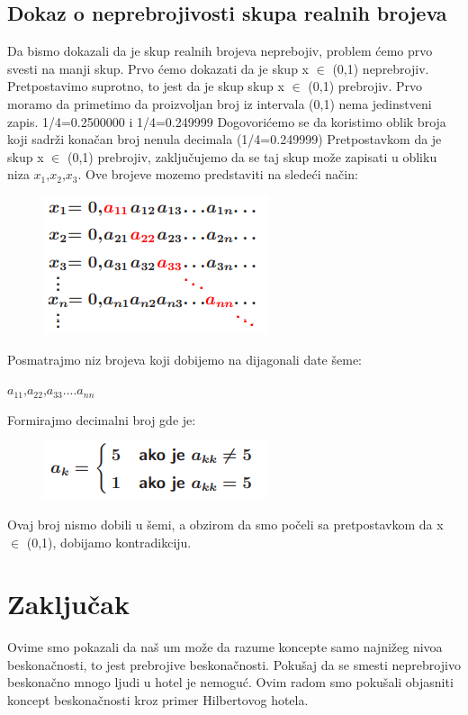 \documentclass[a4paper]{article}
\begin{document}
\subsection{Dokaz o neprebrojivosti skupa realnih brojeva}
Da bismo dokazali da je skup realnih brojeva neprebojiv, problem ćemo prvo svesti na manji skup. 
Prvo ćemo dokazati da je skup x $\in$ (0,1) neprebrojiv.
\newline
Pretpostavimo suprotno, to jest da je skup skup x $\in$ (0,1) prebrojiv.
Prvo moramo da primetimo da proizvoljan broj iz intervala (0,1) nema jedinstveni zapis. 
1/4=0.2500000 i 1/4=0.249999
Dogovorićemo se da koristimo oblik broja koji sadrži konačan broj nenula decimala (1/4=0.249999)
Pretpostavkom da je skup x $\in$ (0,1) prebrojiv, zaključujemo da se taj skup može zapisati u obliku niza {$x_{1}$,$x_{2}$,$x_{3}$}.
\newline
Ove brojeve mozemo predstaviti na sledeći način:
 \begin{figure}[ht!]
    \begin{center}
    \includegraphics[scale=1.00]{tnp.png}
    \end{center}
    \end{figure}
\newpage
Posmatrajmo niz brojeva koji dobijemo na dijagonali date šeme:

$a_{11}$,$a_{22}$,$a_{33}$....$a_{nn}$

Formirajmo decimalni broj gde je:
\begin{figure}[ht!]
    \begin{center}
    \includegraphics[scale=1.30]{tnp2.png}
    \end{center}
    \end{figure}

Ovaj broj nismo dobili u šemi, a obzirom da smo počeli sa pretpostavkom da x $\in$ (0,1), dobijamo kontradikciju.
\section{Zaključak}
Ovime smo pokazali da naš um može da razume koncepte samo najnižeg nivoa beskonačnosti, to jest prebrojive beskonačnosti.
Pokušaj da se smesti neprebrojivo beskonačno mnogo ljudi u hotel je nemoguć. Ovim radom smo pokušali objasniti koncept beskonačnosti kroz primer Hilbertovog hotela.
\end{document}

